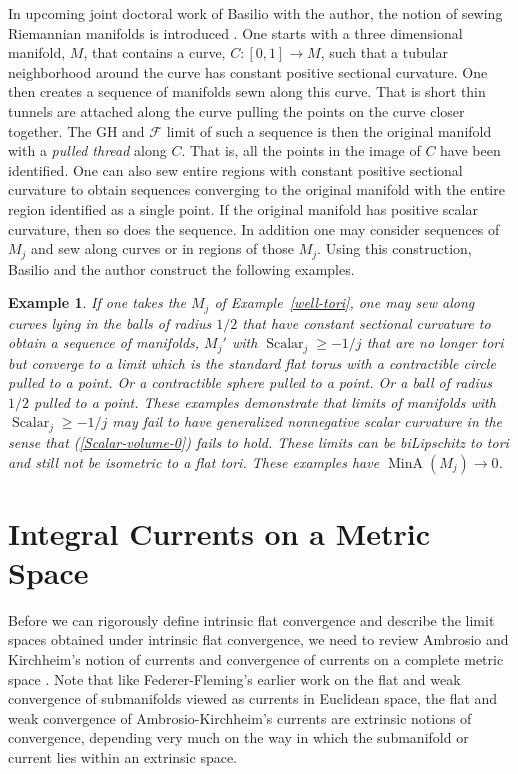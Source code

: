 \documentclass[12pt]{amsart}
\newtheorem{example}[thm]{Example}
\begin{document}
In upcoming joint doctoral work of Basilio with the author, the notion
of sewing Riemannian manifolds is introduced \cite{Basilio-Sormani-1}.  One starts with a 
three dimensional manifold, $M$, that contains a curve, $C:[0,1]\to M$, 
such that a tubular neighborhood around the curve has constant positive
sectional curvature.
One then creates a sequence of manifolds sewn along this curve.  That
is short thin tunnels are attached along the curve pulling the points on the
curve closer together.   The GH and $\mathcal{F}$ limit of such a sequence
is then the original manifold with a {\em pulled thread} along $C$.  That is, all the
points in the image of $C$ have been identified.   One can also sew entire
regions with constant positive sectional curvature to obtain sequences
converging to the original manifold with the entire region identified as a
single point.   If the original manifold has positive scalar curvature, then
so does the sequence.  In addition one may consider sequences of
$M_j$ and sew along curves or in regions of those $M_j$. 
Using this construction, Basilio and the author 
construct the following examples.

\begin{example}\label{sewing-tori}
If one takes the $M_j$ of Example~\ref{well-tori}, one may sew
along curves lying in the balls of radius $1/2$ that have constant
sectional curvature to obtain a sequence of manifolds, $M_j'$ with 
${\operatorname{Scalar}}_j \ge -1/j$ that are no longer tori but converge to
a limit which is the standard flat torus with a contractible circle 
pulled to a point.   Or a contractible sphere pulled to a point.  Or
a ball of radius $1/2$ pulled to a point.     These examples demonstrate
that limits of manifolds with ${\operatorname{Scalar}}_j\ge -1/j$ may fail to have generalized
nonnegative scalar curvature in the sense that (\ref{Scalar-volume-0})
fails to hold.  These limits can be biLipschitz to tori and still not be
isometric to a flat tori.  These examples have ${\operatorname{MinA}}(M_j)\to 0$.
\end{example}

\vspace{.4cm}
\section{Integral Currents on a Metric Space}\label{sect-ext}

Before we can rigorously 
define intrinsic flat convergence and describe the limit spaces
obtained under intrinsic flat convergence, we need to review 
Ambrosio and Kirchheim's notion of currents and convergence of
currents on a complete metric space \cite{AK}.  Note that like
Federer-Fleming's earlier work on the flat and weak convergence of submanifolds
viewed as currents in Euclidean space, the flat and weak convergence
of Ambrosio-Kirchheim's currents are extrinsic notions of
convergence, depending very much on the way in which the submanifold
or current lies within an extrinsic space.
\end{document}
